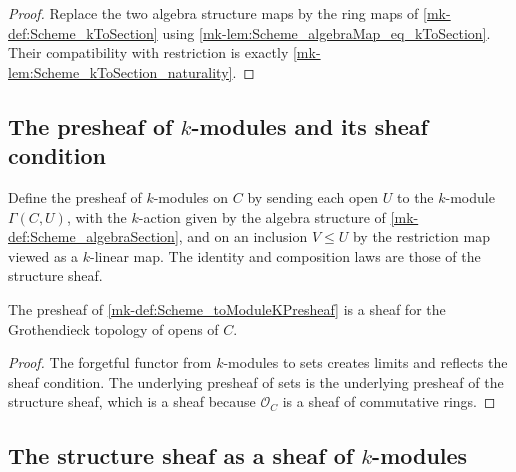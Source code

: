 \begin{proof}
  \leanok

  Replace the two algebra structure maps by the ring maps of \ref{mk-def:Scheme_kToSection} using \ref{mk-lem:Scheme_algebraMap_eq_kToSection}. Their compatibility with restriction is exactly \ref{mk-lem:Scheme_kToSection_naturality}.
\end{proof}

\subsection{The presheaf of \(k\)-modules and its sheaf condition}

\begin{definition}\label{mk-def:Scheme_toModuleKPresheaf}
  \leanok


  Define the presheaf of \(k\)-modules on \(C\) by sending each open \(U\) to the \(k\)-module \(\Gamma(C, U)\), with the \(k\)-action given by the algebra structure of \ref{mk-def:Scheme_algebraSection}, and on an inclusion \(V \le U\) by the restriction map viewed as a \(k\)-linear map. The identity and composition laws are those of the structure sheaf.
\end{definition}

\begin{theorem}\label{mk-thm:Scheme_toModuleKPresheaf_isSheaf}
  \leanok


  The presheaf of \ref{mk-def:Scheme_toModuleKPresheaf} is a sheaf for the Grothendieck topology of opens of \(C\).
\end{theorem}

\begin{proof}
  \leanok

  The forgetful functor from \(k\)-modules to sets creates limits and reflects the sheaf condition. The underlying presheaf of sets is the underlying presheaf of the structure sheaf, which is a sheaf because \(\mathcal O_C\) is a sheaf of commutative rings.
\end{proof}

\subsection{The structure sheaf as a sheaf of \(k\)-modules}

